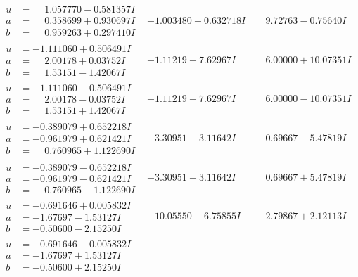 \documentclass[1p]{elsarticle_modified}
\theoremstyle{definition}
\begin{document}
$$\begin{array}{c|c|c}
\begin{aligned}
u &= \phantom{-}1.057770 - 0.581357 I \\
a &= \phantom{-}0.358699 + 0.930697 I \\
b &= \phantom{-}0.959263 + 0.297410 I\end{aligned}
 & -1.003480 + 0.632718 I & \phantom{-}9.72763 - 0.75640 I \\ \hline\begin{aligned}
u &= -1.111060 + 0.506491 I \\
a &= \phantom{-}2.00178 + 0.03752 I \\
b &= \phantom{-}1.53151 - 1.42067 I\end{aligned}
 & -1.11219 - 7.62967 I & \phantom{-}6.00000 + 10.07351 I \\ \hline\begin{aligned}
u &= -1.111060 - 0.506491 I \\
a &= \phantom{-}2.00178 - 0.03752 I \\
b &= \phantom{-}1.53151 + 1.42067 I\end{aligned}
 & -1.11219 + 7.62967 I & \phantom{-}6.00000 - 10.07351 I \\ \hline\begin{aligned}
u &= -0.389079 + 0.652218 I \\
a &= -0.961979 + 0.621421 I \\
b &= \phantom{-}0.760965 + 1.122690 I\end{aligned}
 & -3.30951 + 3.11642 I & \phantom{-}0.69667 - 5.47819 I \\ \hline\begin{aligned}
u &= -0.389079 - 0.652218 I \\
a &= -0.961979 - 0.621421 I \\
b &= \phantom{-}0.760965 - 1.122690 I\end{aligned}
 & -3.30951 - 3.11642 I & \phantom{-}0.69667 + 5.47819 I \\ \hline\begin{aligned}
u &= -0.691646 + 0.005832 I \\
a &= -1.67697 - 1.53127 I \\
b &= -0.50600 - 2.15250 I\end{aligned}
 & -10.05550 - 6.75855 I & \phantom{-}2.79867 + 2.12113 I \\ \hline\begin{aligned}
u &= -0.691646 - 0.005832 I \\
a &= -1.67697 + 1.53127 I \\
b &= -0.50600 + 2.15250 I\end{aligned}

\end{array}$$
\end{document}
